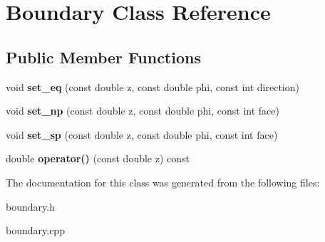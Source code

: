 \hypertarget{classBoundary}{
\section{Boundary Class Reference}
\label{classBoundary}
}
\subsection*{Public Member Functions}
\begin{DoxyCompactItemize}
\item 
\hypertarget{classBoundary_aa94cce55a638abcc45abf0f0fcc83ee6}{
void {\bfseries set\_\-eq} (const double z, const double phi, const int direction)}
\label{classBoundary_aa94cce55a638abcc45abf0f0fcc83ee6}

\item 
\hypertarget{classBoundary_adad35404b6ec806fe0d6284774ca5774}{
void {\bfseries set\_\-np} (const double z, const double phi, const int face)}
\label{classBoundary_adad35404b6ec806fe0d6284774ca5774}

\item 
\hypertarget{classBoundary_a871be9477c3af4a161ec168ff372b2ef}{
void {\bfseries set\_\-sp} (const double z, const double phi, const int face)}
\label{classBoundary_a871be9477c3af4a161ec168ff372b2ef}

\item 
\hypertarget{classBoundary_ae86988e53f6eef14679927f4704d29cc}{
double {\bfseries operator()} (const double z) const }
\label{classBoundary_ae86988e53f6eef14679927f4704d29cc}

\end{DoxyCompactItemize}


The documentation for this class was generated from the following files:\begin{DoxyCompactItemize}
\item 
boundary.h\item 
boundary.cpp\end{DoxyCompactItemize}
